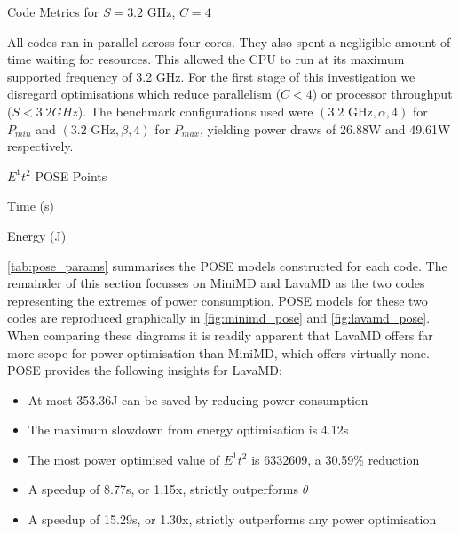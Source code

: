 \begin{table}
\centering
\caption{Code Metrics for $S = 3.2\text{ GHz}$, $C = 4$}
\label{tab:code_metrics}

\end{table}

All codes ran in parallel across four cores.
They also spent a negligible amount of time waiting for resources. 
This allowed the CPU to run at its maximum supported frequency of 3.2 GHz.
For the first stage of this investigation we disregard optimisations which reduce parallelism ($C < 4$) or processor throughput ($S < 3.2GHz$).
The benchmark configurations used were $(\text{3.2 GHz}, \alpha, 4)$ for $P_{min}$ and $(\text{3.2 GHz}, \beta, 4)$ for $P_{max}$, yielding power draws of 26.88W and 49.61W respectively.

\begin{table}
  \setlength{\tabcolsep}{.5em}
  \caption{$E^1t^2$ POSE Points}
  \begin{subtable}{\textwidth}
  \centering
  \caption{Time (s)}
  
  \end{subtable}
  \begin{subtable}{\textwidth}
  \centering
  \caption{Energy (J)}
  
  \end{subtable}
  \label{tab:pose_params}
\end{table}

\autoref{tab:pose_params} summarises the POSE models constructed for each code.
The remainder of this section focusses on MiniMD and LavaMD as the two codes representing the extremes of power consumption.
POSE models for these two codes are reproduced graphically in \autoref{fig:minimd_pose} and \autoref{fig:lavamd_pose}.
When comparing these diagrams it is readily apparent that LavaMD offers far more scope for power optimisation than MiniMD, which offers virtually none. 
POSE provides the following insights for LavaMD:
\begin{itemize}
  \item At most 353.36J can be saved by reducing power consumption
  \item The maximum slowdown from energy optimisation is 4.12s
  \item The most power optimised value of $E^1t^2$ is 6332609, a 30.59\% reduction
  \item A speedup of 8.77s, or 1.15x, strictly outperforms $\theta$
  \item A speedup of 15.29s, or 1.30x, strictly outperforms any power optimisation
\end{itemize}

